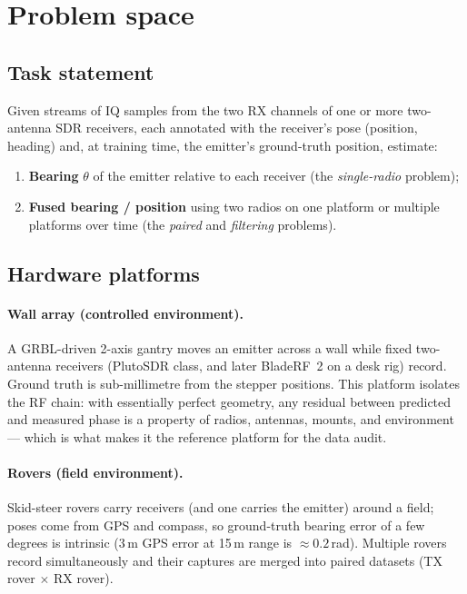 \section{Problem space}
\label{sec:problem}

\subsection{Task statement}

Given streams of IQ samples from the two RX channels of one or more
two-antenna SDR receivers, each annotated with the receiver's pose (position,
heading) and, at training time, the emitter's ground-truth position, estimate:

\begin{enumerate}
  \item \textbf{Bearing} $\theta$ of the emitter relative to each receiver
        (the \emph{single-radio} problem);
  \item \textbf{Fused bearing / position} using two radios on one platform or
        multiple platforms over time (the \emph{paired} and \emph{filtering}
        problems).
\end{enumerate}

\subsection{Hardware platforms}

\paragraph{Wall array (controlled environment).}
A GRBL-driven 2-axis gantry moves an emitter across a wall while fixed
two-antenna receivers (PlutoSDR class, and later BladeRF~2 on a desk rig)
record. Ground truth is sub-millimetre from the stepper positions. This
platform isolates the RF chain: with essentially perfect geometry, any
residual between predicted and measured phase is a property of radios,
antennas, mounts, and environment --- which is what makes it the reference
platform for the data audit.

\paragraph{Rovers (field environment).}
Skid-steer rovers carry receivers (and one carries the emitter) around a
field; poses come from GPS and compass, so ground-truth bearing error of a few
degrees is intrinsic (3\,m GPS error at 15\,m range is
$\approx 0.2$\,rad). Multiple rovers record simultaneously and their captures
are merged into paired datasets (TX rover $\times$ RX rover).

